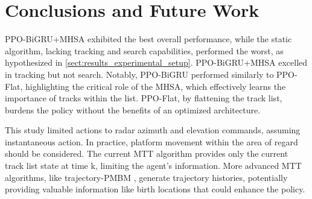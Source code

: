\section{Conclusions and Future Work}
\label{sect:conclusion_future_work}



PPO-BiGRU+MHSA exhibited the best overall performance, while the static algorithm, lacking tracking and search capabilities, performed the worst, as hypothesized in \autoref{sect:results_experimental_setup}. PPO-BiGRU+MHSA excelled in tracking but not search. Notably, PPO-BiGRU performed similarly to PPO-Flat, highlighting the critical role of the MHSA, which effectively learns the importance of tracks within the list. PPO-Flat, by flattening the track list, burdens the policy without the benefits of an optimized architecture.

This study limited actions to radar azimuth and elevation commands, assuming instantaneous action. In practice, platform movement within the area of regard should be considered. The current MTT algorithm provides only the current track list state at time k, limiting the agent's information. More advanced MTT algorithms, like trajectory-PMBM \cite{garcia2020trajectory}, generate trajectory histories, potentially providing valuable information like birth locations that could enhance the policy.